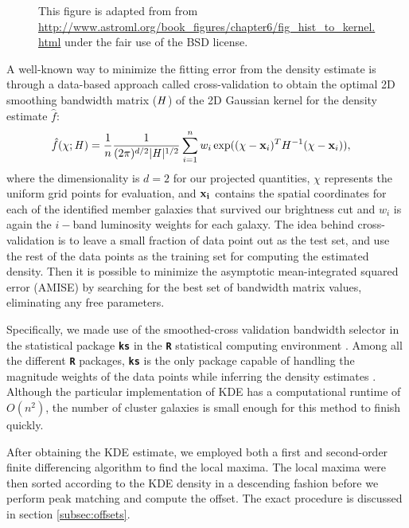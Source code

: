 \begin{figure*}
	\caption{This figure is adapted from \citealt{Vanderplas2012} from
\href{http://www.astroml.org/book\_figures/chapter6/fig\_hist\_to\_kernel.html}{http://www.astroml.org/book\_figures/chapter6/fig\_hist\_to\_kernel.html}
under the fair use of the BSD license. \label{fig:bias_variance_tradeoff}
}
\end{figure*}
A well-known way to minimize the fitting error from the density estimate is through
a data-based approach called cross-validation to obtain 
the optimal 2D smoothing
bandwidth matrix ($\mathbf{\it H}$) of the 2D Gaussian kernel for the
density estimate $\hat{f}$:
\begin{align}
	\hat{f}(\chi; \mathbf{\it H}) &= \frac{1}{n} \frac{1}{(2\pi)^{d/2}|\mathbf{\it H}|^{1/2}}
	\sum_{i=1}^n w_i \exp((\chi-{\bf x}_i)^T H^{-1} (\chi-{\bf x}_i)),
	\label{eq:cross_validated_bandwidth}
\end{align}
where the dimensionality is $d=2$ for our projected quantities,
$\chi$ represents the uniform grid points for evaluation, and 
$\bf{x}_i$ contains the spatial coordinates for each of the identified member 
galaxies that survived our brightness cut and $w_i$ is again the $i-$band
luminosity weights for each galaxy.
The idea behind cross-validation is to leave a small fraction of data point 
out as the test set, and use the rest of the data points as 
the training set for computing the estimated density.
Then it is possible to minimize the asymptotic mean-integrated squared error
(AMISE)  by searching
for the best set of bandwidth matrix values, eliminating any free parameters. 

Specifically, we made use of the smoothed-cross validation \citep{Hall1992} 
bandwidth selector in the statistical package {\bf \texttt{ks}} \citep{Duong2007} 
in the {\bf \texttt{R}} statistical computing environment \citep{R_core}. 
Among all the different {\bf \texttt{R}} packages, {\bf \texttt{ks}} is the
only package capable of handling the magnitude weights of the data points 
while inferring the density estimates \citep{Deng2011}. 
Although the particular implementation of KDE has a computational runtime of $O(n^2)$, 
the number of cluster galaxies is
small enough for this method to finish quickly. 

After obtaining the KDE estimate, we employed both a first and second-order  
finite differencing algorithm to find the local maxima.  
The local maxima were then sorted according to the KDE density in a descending
fashion before we perform peak matching and compute the offset. The exact
procedure is discussed in section \ref{subsec:offsets}. 


